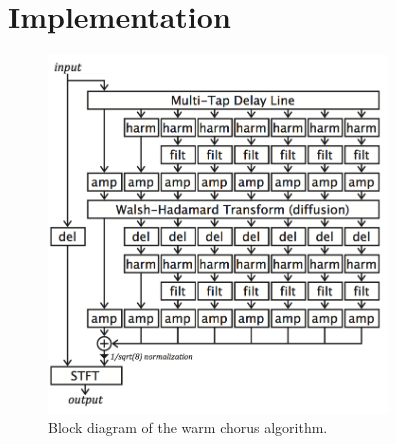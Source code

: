 \section{Implementation}
\begin{figure}[ht]
\centering
\includegraphics[width= 9cm]{Structure.png}
\caption{Block diagram of the warm chorus algorithm. \cite{dudas}}
\label{fig:struct}
\end{figure}